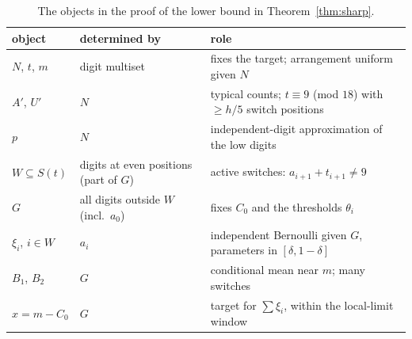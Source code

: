 \documentclass[11pt]{article}
\theoremstyle{definition}
\theoremstyle{remark}
\begin{document}
\begin{table}[h]
\centering
\small
\begin{tabular}{>{\raggedright}p{2.3cm}>{\raggedright}p{3.6cm}>{\raggedright\arraybackslash}p{6.8cm}}
\toprule
object & determined by & role\\
\midrule
$N$, $t$, $m$ & digit multiset & fixes the target; arrangement uniform given $N$\\
$A'$, $U'$ & $N$ & typical counts; $t\equiv9$ (mod $18$) with $\ge h/5$ switch positions\\
$p$ & $N$ & independent-digit approximation of the low digits\\
$W\subseteq S(t)$ & digits at even positions (part of $G$) & active switches: $a_{i+1}+t_{i+1}\ne9$\\
$G$ & all digits outside $W$ (incl.\ $a_0$) & fixes $C_0$ and the thresholds $\theta_i$\\
$\xi_i$, $i\in W$ & $a_i$ & independent Bernoulli given $G$, parameters in $[\delta,1-\delta]$\\
$B_1$, $B_2$ & $G$ & conditional mean near $m$; many switches\\
$x=m-C_0$ & $G$ & target for $\sum\xi_i$, within the local-limit window\\
\bottomrule
\end{tabular}
\caption{The objects in the proof of the lower bound in
Theorem~\ref{thm:sharp}.}\label{tab:plan}
\end{table}
\end{document}
